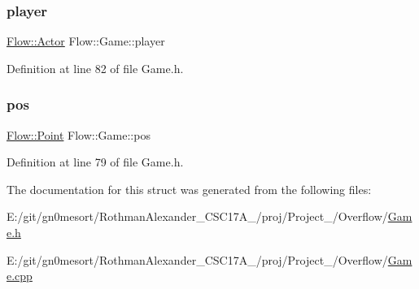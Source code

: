 \subsubsection{\texorpdfstring{player}{player}}
{\footnotesize\ttfamily \hyperlink{class_flow_1_1_actor}{Flow\+::\+Actor} Flow\+::\+Game\+::player\hspace{0.3cm}{\ttfamily [static]}}



Definition at line 82 of file Game.\+h.

\hypertarget{struct_flow_1_1_game_ac624f04e5b1f64bcc126455cebd657a0}{}\label{struct_flow_1_1_game_ac624f04e5b1f64bcc126455cebd657a0} 
\subsubsection{\texorpdfstring{pos}{pos}}
{\footnotesize\ttfamily \hyperlink{struct_flow_1_1_point}{Flow\+::\+Point} Flow\+::\+Game\+::pos\hspace{0.3cm}{\ttfamily [static]}}



Definition at line 79 of file Game.\+h.



The documentation for this struct was generated from the following files\+:\begin{DoxyCompactItemize}
\item 
E\+:/git/gn0mesort/\+Rothman\+Alexander\+\_\+\+C\+S\+C17\+A\+\_/proj/\+Project\+\_/\+Overflow/\hyperlink{_game_8h}{Game.\+h}\item 
E\+:/git/gn0mesort/\+Rothman\+Alexander\+\_\+\+C\+S\+C17\+A\+\_/proj/\+Project\+\_/\+Overflow/\hyperlink{_game_8cpp}{Game.\+cpp}\end{DoxyCompactItemize}
